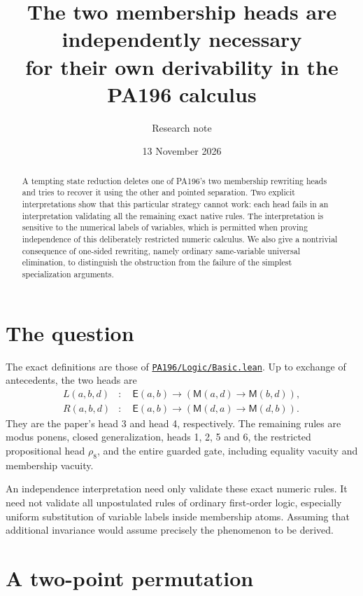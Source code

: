 \documentclass[10pt]{article}
\title{The two membership heads are independently necessary\\for their own derivability in the PA196 calculus}
\author{Research note}
\date{13 November 2026}
\newcommand{\M}{\mathsf M}
\newcommand{\E}{\mathsf E}
\begin{document}
\maketitle

\begin{abstract}
A tempting state reduction deletes one of PA196's two membership
rewriting heads and tries to recover it using the other and pointed
separation.  Two explicit interpretations show that this particular
strategy cannot work: each head fails in an interpretation validating
all the remaining exact native rules.  The interpretation is sensitive
to the numerical labels of variables, which is permitted when proving
independence of this deliberately restricted numeric calculus.  We also
give a nontrivial consequence of one-sided rewriting, namely ordinary
same-variable universal elimination, to distinguish the obstruction
from the failure of the simplest specialization arguments.
\end{abstract}

\section{The question}

The exact definitions are those of
\href{https://github.com/jamesyc/BusyBeaver/blob/407cdc356f6b586635e71ac92be394255f4bfea4/PA196/Logic/Basic.lean}{\texttt{PA196/Logic/Basic.lean}}.
Up to exchange of antecedents, the two heads are
\begin{align*}
 L(a,b,d)&:\quad \E(a,b)\to(\M(a,d)\to\M(b,d)),\\
 R(a,b,d)&:\quad \E(a,b)\to(\M(d,a)\to\M(d,b)).
\end{align*}
They are the paper's head 3 and head 4, respectively.  The remaining
rules are modus ponens, closed generalization, heads 1, 2, 5 and 6,
the restricted propositional head $\rho_8$, and the entire guarded gate,
including equality vacuity and membership vacuity.

An independence interpretation need only validate these exact numeric
rules.  It need not validate all unpostulated rules of ordinary
first-order logic, especially uniform substitution of variable labels
inside membership atoms.  Assuming that additional invariance would
assume precisely the phenomenon to be derived.

\section{A two-point permutation}
\end{document}
